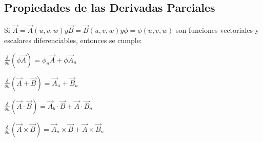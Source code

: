 \documentclass[a4paper]{article}
\begin{document}
\subsection{Propiedades de las Derivadas Parciales}
Si $\vec{A}=\vec{A}(u,v,w) y\vec{B}=\vec{B}(u,v,w) y \phi=\phi(u,v,w)$ son funciones vectoriales y escalares diferenciables, entonces se cumple:
\begin{enumerate}
{\item $\frac{\delta}{\delta u}(\phi\vec{A})=\phi_u\vec{A}+\phi\vec{A}_u$}
{\item $\frac{\delta}{\delta u}(\vec{A}+\vec{B})=\vec{A}_u+\vec{B}_u$}
{\item $\frac{\delta}{\delta u}(\vec{A}\cdot\vec{B})=\vec{A}_b\cdot\vec{B}+\vec{A}\cdot\vec{B}_u$}
{\item $\frac{\delta}{\delta u}(\vec{A}\times\vec{B})=\vec{A}_u\times\vec{B}+\vec{A}\times\vec{B}_u$}
\end{enumerate}
\end{document}
